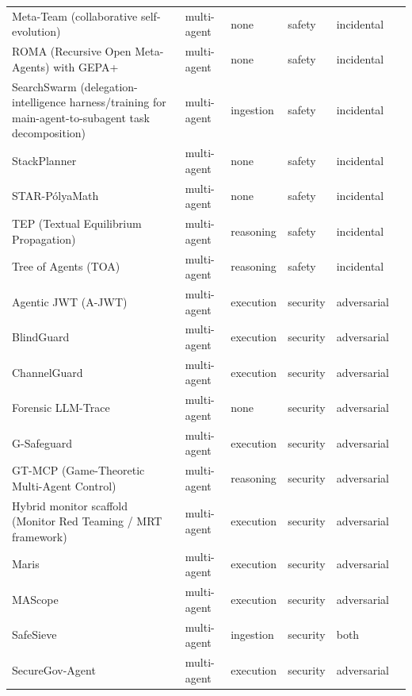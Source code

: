 \begin{longtable}{@{}>{\raggedright\arraybackslash}p{}lllll@{}}
Meta-Team (collaborative self-evolution) & multi-agent & none & safety & incidental & \cite{hao-2026-evolve} \\
ROMA (Recursive Open Meta-Agents) with GEPA+ & multi-agent & none & safety & incidental & \cite{alzubi-2026-roma} \\
SearchSwarm (delegation-intelligence harness/training for main-agent-to-subagent task decomposition) & multi-agent & ingestion & safety & incidental & \cite{ning-2026-searchswarm} \\
StackPlanner & multi-agent & none & safety & incidental & \cite{zhang-2026-stackplanner} \\
STAR-PólyaMath & multi-agent & none & safety & incidental & \cite{wu-2026-starp} \\
TEP (Textual Equilibrium Propagation) & multi-agent & reasoning & safety & incidental & \cite{chen-2026-textual} \\
Tree of Agents (TOA) & multi-agent & reasoning & safety & incidental & \cite{yu-2025-tree} \\
Agentic JWT (A-JWT) & multi-agent & execution & security & adversarial & \cite{goswami-2025-agentic} \\
BlindGuard & multi-agent & execution & security & adversarial & \cite{miao-2025-blindguard} \\
ChannelGuard & multi-agent & execution & security & adversarial & \cite{hossain-2026-channelguard} \\
Forensic LLM-Trace & multi-agent & none & security & adversarial & \cite{s-2026-forensic} \\
G-Safeguard & multi-agent & execution & security & adversarial & \cite{wang-2025-gsafeguard} \\
GT-MCP (Game-Theoretic Multi-Agent Control) & multi-agent & reasoning & security & adversarial & \cite{jamshidi-2026-gametheoretic} \\
Hybrid monitor scaffold (Monitor Red Teaming / MRT framework) & multi-agent & execution & security & adversarial & \cite{kale-2025-reliable} \\
Maris & multi-agent & execution & security & adversarial & \cite{cui-2025-maris} \\
MAScope & multi-agent & execution & security & adversarial & \cite{wei-2026-input} \\
SafeSieve & multi-agent & ingestion & security & both & \cite{zhang-2025-safesieve} \\
SecureGov-Agent & multi-agent & execution & security & adversarial & \cite{chen-2025-securegovagent} \\

\end{longtable}
